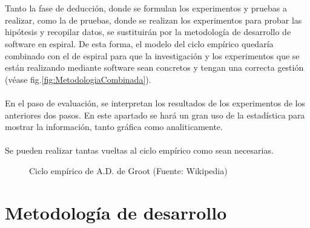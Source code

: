\\ \\
Tanto la fase de deducción, donde se formulan los experimentos y pruebas a realizar, como la de pruebas, donde se realizan los experimentos para probar las hipótesis y recopilar datos, se sustituirán por la metodología de desarrollo de software en espiral. De esta forma, el modelo del ciclo empírico quedaría combinado con el de espiral para que la investigación y los experimentos que se están realizando mediante software sean concretos y tengan una correcta gestión (véase fig.\ref{fig:MetodologiaCombinada}). 
\\ \\
En el paso de evaluación, se interpretan los resultados de los experimentos de los anteriores dos pasos. En este apartado se hará un gran uso de  la estadística para mostrar la información, tanto gráfica como analiticamente.
\\ \\
Se pueden realizar tantas vueltas al ciclo empírico como sean necesarias.
\begin{figure}[thbp]
    \centering
    \caption{Ciclo empírico de A.D. de Groot (Fuente: Wikipedia\autocite{InvestigacionEmpirica2020})} 
    \label{fig:CicloEmpirico}
\end{figure}
\section{Metodología de desarrollo}

